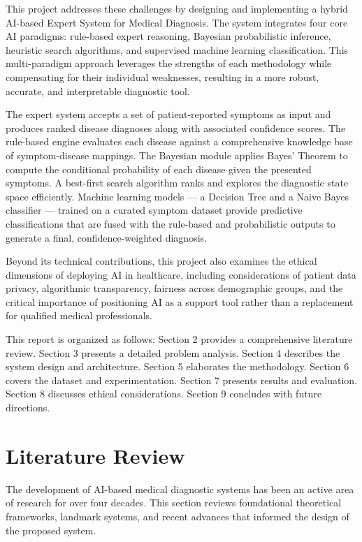 \documentclass[12pt,a4paper]{article}
\begin{document}
This project addresses these challenges by designing and implementing a hybrid AI-based Expert System for Medical Diagnosis. The system integrates four core AI paradigms: rule-based expert reasoning, Bayesian probabilistic inference, heuristic search algorithms, and supervised machine learning classification. This multi-paradigm approach leverages the strengths of each methodology while compensating for their individual weaknesses, resulting in a more robust, accurate, and interpretable diagnostic tool.

The expert system accepts a set of patient-reported symptoms as input and produces ranked disease diagnoses along with associated confidence scores. The rule-based engine evaluates each disease against a comprehensive knowledge base of symptom-disease mappings. The Bayesian module applies Bayes' Theorem to compute the conditional probability of each disease given the presented symptoms. A best-first search algorithm ranks and explores the diagnostic state space efficiently. Machine learning models --- a Decision Tree and a Naive Bayes classifier --- trained on a curated symptom dataset provide predictive classifications that are fused with the rule-based and probabilistic outputs to generate a final, confidence-weighted diagnosis.

Beyond its technical contributions, this project also examines the ethical dimensions of deploying AI in healthcare, including considerations of patient data privacy, algorithmic transparency, fairness across demographic groups, and the critical importance of positioning AI as a support tool rather than a replacement for qualified medical professionals.

This report is organized as follows: Section 2 provides a comprehensive literature review. Section 3 presents a detailed problem analysis. Section 4 describes the system design and architecture. Section 5 elaborates the methodology. Section 6 covers the dataset and experimentation. Section 7 presents results and evaluation. Section 8 discusses ethical considerations. Section 9 concludes with future directions.

\section{Literature Review}

The development of AI-based medical diagnostic systems has been an active area of research for over four decades. This section reviews foundational theoretical frameworks, landmark systems, and recent advances that informed the design of the proposed system.
\end{document}
